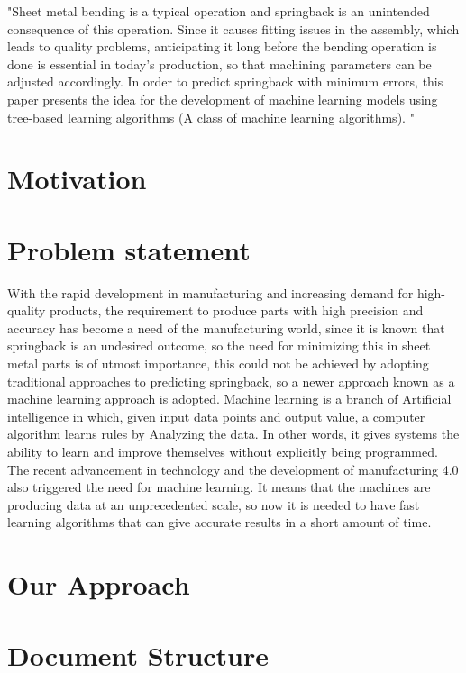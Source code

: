 "Sheet metal bending is a typical operation and springback is an unintended consequence of this 
operation. Since it causes fitting issues in the assembly, which leads to quality problems, anticipating it 
long before the bending operation is done is essential in today's production, so that machining 
parameters can be adjusted accordingly. In order to predict springback with minimum errors, this paper 
presents the idea for the development of machine learning models using tree-based learning algorithms 
(A class of machine learning algorithms).
"

\section{Motivation} %

\section{Problem statement}
With the rapid development in manufacturing and increasing demand for high-quality products, the 
requirement to produce parts with high precision and accuracy has become a need of the manufacturing 
world, since it is known that springback is an undesired outcome, so the need for minimizing this in 
sheet metal parts is of utmost importance, this could not be achieved by adopting traditional approaches 
to predicting springback, so a newer approach known as a machine learning approach is adopted. 
Machine learning is a branch of Artificial intelligence in which, given input data points and output 
value, a computer algorithm learns rules by Analyzing the data. In other words, it gives systems the 
ability to learn and improve themselves without explicitly being programmed. The recent advancement 
in technology and the development of manufacturing 4.0 also triggered the need for machine learning. 
It means that the machines are producing data at an unprecedented scale, so now it is needed to have 
fast learning algorithms that can give accurate results in a short amount of time. 
\cite[]{baig_machinelearningprediction_2021}

\section{Our Approach}

\section{Document Structure}
